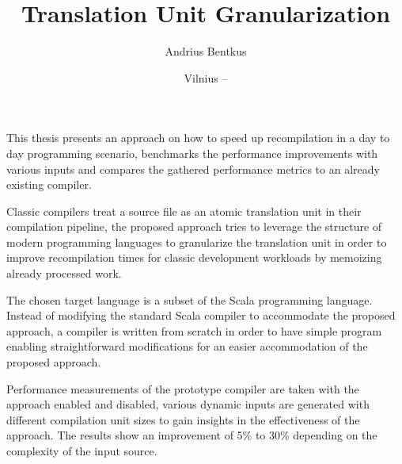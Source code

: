 \documentclass{VUMIFPSbakalaurinis}
\institute{Informatikos institutas}  %
\title{Translation Unit Granularization}
\author{Andrius Bentkus}
\date{Vilnius – \the\year}
\begin{document}
\maketitle


\addtocounter{page}{1}

This thesis presents an approach on how to speed up recompilation in a day to day programming scenario, benchmarks the performance improvements with various inputs and compares the gathered performance metrics to an already existing compiler.

Classic compilers treat a source file as an atomic translation unit in their compilation pipeline, the proposed approach tries to leverage the structure of modern programming languages to granularize the translation unit in order to improve recompilation times for classic development workloads by memoizing already processed work.

The chosen target language is a subset of the Scala programming language.
Instead of modifying the standard Scala compiler to accommodate the proposed approach, a compiler is written from scratch in order to have simple program enabling straightforward modifications for an easier accommodation of the proposed approach.

Performance measurements of the prototype compiler are taken with the approach enabled and disabled, various dynamic inputs are generated with different compilation unit sizes to gain insights in the effectiveness of the approach. The results show an improvement of 5\% to 30\% depending on the complexity of the input source.





\tableofcontents


\end{document}
